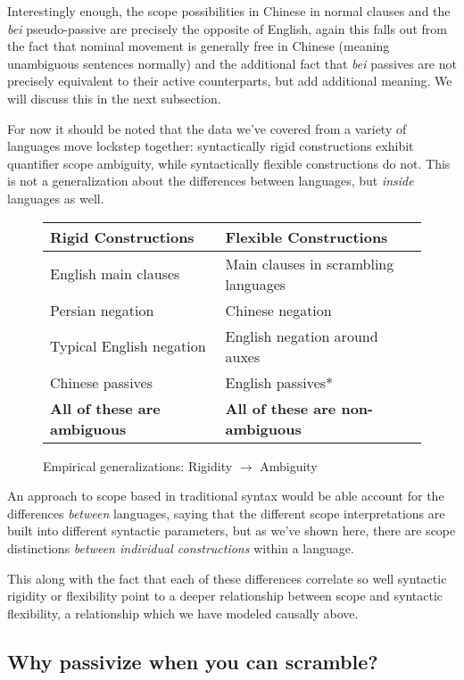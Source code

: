 \documentclass{article}
\begin{document}
Interestingly enough, the scope possibilities in Chinese in normal clauses and the \emph{bei} pseudo-passive are precisely the opposite of English, again this falls out from the fact that nominal movement is generally free in Chinese (meaning unambiguous sentences normally) and the additional fact that \emph{bei} passives are not precisely equivalent to their active counterparts, but add additional meaning.
We will discuss this in the next subsection.

For now it should be noted that the data we've covered from a variety of languages move lockstep together: syntactically rigid constructions exhibit quantifier scope ambiguity, while syntactically flexible constructions do not.
This is not a generalization about the differences between languages, but \emph{inside} languages as well.

\begin{figure}
\begin{tabular}{ll}
	Rigid Constructions & Flexible Constructions \\\hline\hline
	English main clauses & Main clauses in scrambling languages \\
	Persian negation & Chinese negation \\
	Typical English negation & English negation around auxes \\
	Chinese passives & English passives*\\
	\textbf{All of these are ambiguous} & \textbf{All of these are non-ambiguous}\\
\end{tabular}
	\caption{Empirical generalizations: Rigidity ${\rightarrow}$ Ambiguity}
\end{figure}

An approach to scope based in traditional syntax would be able account for the differences \emph{between} languages, saying that the different scope interpretations are built into different syntactic parameters, but as we've shown here, there are scope distinctions \emph{between individual constructions} within a language.

This along with the fact that each of these differences correlate so well syntactic rigidity or flexibility point to a deeper relationship between scope and syntactic flexibility, a relationship which we have modeled causally above.


\subsection{Why passivize when you can scramble?\label{passscr}}
\end{document}
